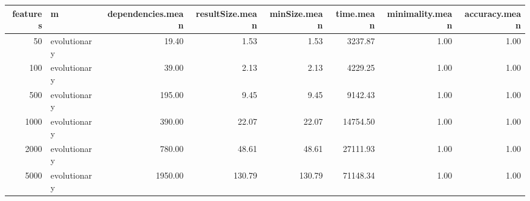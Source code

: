\begin{table}[ht]
\centering
\begin{tabular}{rlrrrrrr}
  \hline
features & m & dependencies.mean & resultSize.mean & minSize.mean & time.mean & minimality.mean & accuracy.mean \\ 
  \hline
 50 & evolutionary & 19.40 & 1.53 & 1.53 & 3237.87 & 1.00 & 1.00 \\ 
  100 & evolutionary & 39.00 & 2.13 & 2.13 & 4229.25 & 1.00 & 1.00 \\ 
  500 & evolutionary & 195.00 & 9.45 & 9.45 & 9142.43 & 1.00 & 1.00 \\ 
  1000 & evolutionary & 390.00 & 22.07 & 22.07 & 14754.50 & 1.00 & 1.00 \\ 
  2000 & evolutionary & 780.00 & 48.61 & 48.61 & 27111.93 & 1.00 & 1.00 \\ 
  5000 & evolutionary & 1950.00 & 130.79 & 130.79 & 71148.34 & 1.00 & 1.00 \\ 
   \hline
\end{tabular}
\end{table}
